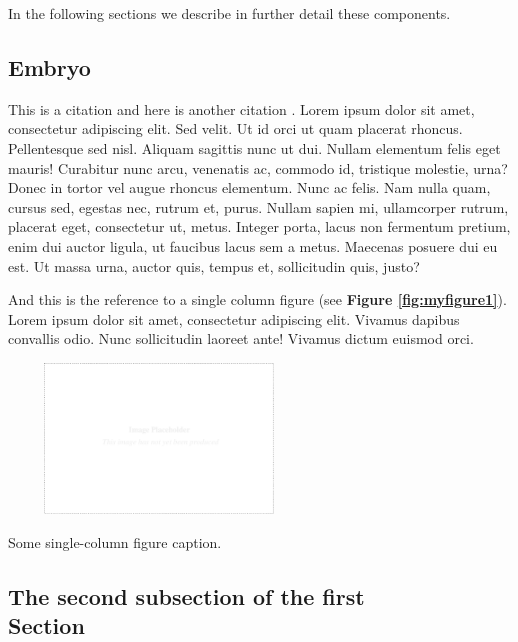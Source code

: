 \documentclass[a4paper,10pt]{article}
\makeatletter
\newenvironment{figurehere}{\def\@captype{figure}\vspace{2ex}}{\vspace{2ex}}
\makeatother
\begin{document}
\begin{multicols}{2}
In the following sections we describe in further detail these components.


\subsection{Embryo}




This is a citation \cite{Norman09Learn} and here is another citation
\cite{Peyton93Howto}.  Lorem ipsum dolor sit amet, consectetur adipiscing elit.
Sed velit. Ut id orci ut quam placerat rhoncus. Pellentesque sed nisl. Aliquam
sagittis nunc ut dui.  Nullam elementum felis eget mauris! Curabitur nunc arcu,
venenatis ac, commodo id, tristique molestie, urna? Donec in tortor vel augue
rhoncus elementum. Nunc ac felis. Nam nulla quam, cursus sed, egestas nec,
rutrum et, purus. Nullam sapien mi, ullamcorper rutrum, placerat eget,
consectetur ut, metus. Integer porta, lacus non fermentum pretium, enim dui
auctor ligula, ut faucibus lacus sem a metus. Maecenas posuere dui eu est. Ut
massa urna, auctor quis, tempus et, sollicitudin quis, justo?


And this is the reference to a single column figure (see {\bf Figure
\ref{fig:myfigure1}}).  Lorem ipsum dolor sit amet, consectetur adipiscing elit.
Vivamus dapibus convallis odio. Nunc sollicitudin laoreet ante! Vivamus dictum
euismod orci.

\begin{figurehere}
 \centering
 \includegraphics[width=8cm, height=4cm]{./eps/placeholder.eps}
 \caption{Some single-column figure caption.}
 \label{fig:myfigure1}
\end{figurehere}


\subsection{The second subsection of the first \\ Section}


\end{multicols}
\end{document}
